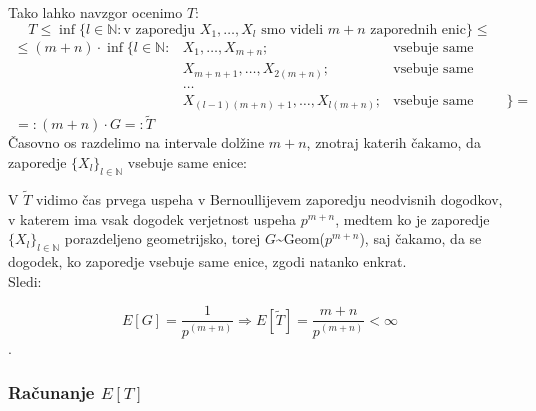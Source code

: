 \documentclass[12pt, a4paper]{article}
\begin{document}
Tako lahko navzgor ocenimo $T$:
$$T \leq \inf\{ l \in \mathbb{N}: \textrm{v zaporedju } X_1, \dots, X_l \textrm{ smo videli } m+n \textrm{ zaporednih enic}\} \leq$$ 
$$
\begin{array} {lll} 
\leq (m+n)\cdot \inf\{ l \in \mathbb{N}:& X_1, \dots, X_{m+n}; & \textrm{vsebuje same enice, ali} \\ 
&X_{m+n+1}, \dots, X_{2(m+n)};& \textrm{vsebuje same enice, ali}\\
&\dots \\
&X_{(l-1)(m+n)+1}, \dots, X_{l(m+n)}; & \textrm{vsebuje same enice}\}=
\end{array}$$
$~~=: (m+n)\cdot G =: \widetilde{T}$\\

Časovno os razdelimo na intervale dolžine $m+n$, znotraj katerih čakamo, da zaporedje $\{X_l\}_{l \in \mathbb{N}}$ vsebuje same enice:
\begin{center}
\end{center}

V $\widetilde{T}$ vidimo čas prvega uspeha v Bernoullijevem zaporedju neodvisnih dogodkov, v katerem ima vsak dogodek verjetnost uspeha $p^{m+n}$, medtem ko je zaporedje 
$\{X_l\}_{l \in \mathbb{N}}$ porazdeljeno geometrijsko, torej $G$\textasciitilde Geom($p^{m+n}$), saj čakamo, da se dogodek, ko zaporedje vsebuje same enice, zgodi natanko enkrat. \\

Sledi:

$$E[G]=\frac{1}{p^{(m+n)}} \Longrightarrow E[\widetilde{T}] = \frac{m+n}{p^{(m+n)}} < \infty$$.

\newpage
\subsubsection{Računanje $E[T]$}
\end{document}

